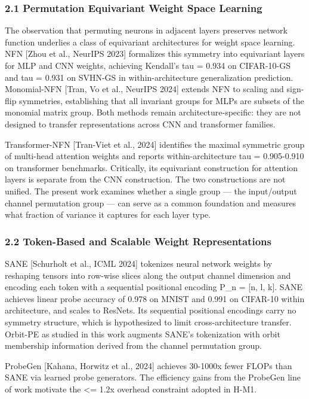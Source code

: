 
\subsubsection{2.1 Permutation Equivariant Weight Space Learning}

The observation that permuting neurons in adjacent layers preserves network function underlies a class of equivariant architectures for weight space learning. NFN [Zhou et al., NeurIPS 2023] formalizes this symmetry into equivariant layers for MLP and CNN weights, achieving Kendall's tau = 0.934 on CIFAR-10-GS and tau = 0.931 on SVHN-GS in within-architecture generalization prediction. Monomial-NFN [Tran, Vo et al., NeurIPS 2024] extends NFN to scaling and sign-flip symmetries, establishing that all invariant groups for MLPs are subsets of the monomial matrix group. Both methods remain architecture-specific: they are not designed to transfer representations across CNN and transformer families.

Transformer-NFN [Tran-Viet et al., 2024] identifies the maximal symmetric group of multi-head attention weights and reports within-architecture tau = 0.905-0.910 on transformer benchmarks. Critically, its equivariant construction for attention layers is separate from the CNN construction. The two constructions are not unified. The present work examines whether a single group — the input/output channel permutation group — can serve as a common foundation and measures what fraction of variance it captures for each layer type.

\subsubsection{2.2 Token-Based and Scalable Weight Representations}

SANE [Schurholt et al., ICML 2024] tokenizes neural network weights by reshaping tensors into row-wise slices along the output channel dimension and encoding each token with a sequential positional encoding P_n = [n, l, k]. SANE achieves linear probe accuracy of 0.978 on MNIST and 0.991 on CIFAR-10 within architecture, and scales to ResNets. Its sequential positional encodings carry no symmetry structure, which is hypothesized to limit cross-architecture transfer. Orbit-PE as studied in this work augments SANE's tokenization with orbit membership information derived from the channel permutation group.

ProbeGen [Kahana, Horwitz et al., 2024] achieves 30-1000x fewer FLOPs than SANE via learned probe generators. The efficiency gains from the ProbeGen line of work motivate the <= 1.2x overhead constraint adopted in H-M1.

